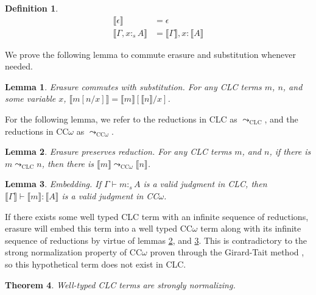 \documentclass[sigplan,screen,review,authordraft]{acmart}
\newtheorem{theorem}{Theorem}[section]
\newtheorem{lemma}[theorem]{Lemma}
\theoremstyle{definition}
\newtheorem{definition}{Definition}[section]
\newcommand{\stype}[1]{:_#1}
\newcommand{\pstep}{\leadsto}
\newcommand{\erase}[1]{\llbracket #1 \rrbracket}
\begin{document}
  \begin{definition}
    \begin{align*}
      \erase{\epsilon} &= \epsilon \\
      \erase{\Gamma, x \stype{s} A} &= \erase{\Gamma}, x : \erase{A}
    \end{align*}
  \end{definition}

  We prove the following lemma to commute erasure and substitution whenever needed.
  \begin{lemma} 
    Erasure commutes with substitution. For any CLC terms $m$, $n$, and some variable $x$, $\erase{m[n/x]} = \erase{m}[\erase{n}/x]$. 
  \end{lemma}

  For the following lemma, we refer to the reductions in CLC as $\pstep_{\scriptscriptstyle \text{CLC}}$, and the reductions in CC$\omega$ as $\pstep_{\scriptscriptstyle \text{CC$\omega$}}$.
  \begin{lemma} \label{preserve} 
    Erasure preserves reduction. For any CLC terms $m$, and $n$, if there is $m \pstep_{\scriptscriptstyle \text{CLC}} n$, then there is $\erase{m} \pstep_{\scriptscriptstyle \text{CC$\omega$}} \erase{n}$.
  \end{lemma}

  \begin{lemma} \label{embedding} 
    Embedding. If $\Gamma \vdash m \stype{s} A$ is a valid judgment in CLC, then $\erase{\Gamma} \vdash \erase{m} : \erase{A}$ is a valid judgment in CC$\omega$.
  \end{lemma}

  If there exists some well typed CLC term with an infinite sequence of reductions, erasure will embed this term into a well typed CC$\omega$ term along with its infinite sequence of reductions by virtue of lemmas \ref{preserve}, and \ref{embedding}. This is contradictory to the strong normalization property of CC$\omega$ proven through the Girard-Tait method \cite{ecc}, so this hypothetical term does not exist in CLC.

  \begin{theorem}
    Well-typed CLC terms are strongly normalizing.
  \end{theorem}
  

\end{document}
